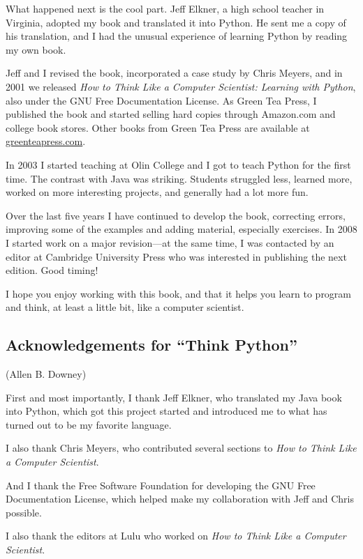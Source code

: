 \documentclass[11pt]{book}
\begin{document}
What happened next is the cool part.  Jeff Elkner, a high school
teacher in Virginia, adopted my book and translated it into
Python.  He sent me a copy of his translation, and I had the
unusual experience of learning Python by reading my own book.

Jeff and I revised the book, incorporated a case study by
Chris Meyers, and in 2001 we released \emph{How to Think Like
a Computer Scientist: Learning with Python}, also under
the GNU Free Documentation License.
As Green Tea Press, I published the book and started selling
hard copies through Amazon.com and college book stores.
Other books from Green Tea Press are available at
\url{greenteapress.com}.

In 2003 I started teaching at Olin College and I got to teach
Python for the first time.  The contrast with Java was striking.
Students struggled less, learned more, worked on more interesting
projects, and generally had a lot more fun.

Over the last five years I have continued to develop the book,
correcting errors, improving some of the examples and
adding material, especially exercises.  In 2008 I started work
on a major revision---at the same time, I was
contacted by an editor at Cambridge University Press who
was interested in publishing the next edition.  Good timing!

I hope you enjoy working with this book, and that it helps
you learn to program and think, at least a little bit, like
a computer scientist.

\subsection*{Acknowledgements for ``Think Python''}

(Allen B. Downey)

First and most importantly, I thank Jeff Elkner, who
translated my Java book into Python, which got this project
started and introduced me to what has turned out to be my
favorite language.

I also thank Chris Meyers, who contributed several sections
to \emph{How to Think Like a Computer Scientist}.

And I thank the Free Software Foundation for developing
the GNU Free Documentation License, which helped make
my collaboration with Jeff and Chris possible.


I also thank the editors at Lulu who worked on
\emph{How to Think Like a Computer Scientist}.
\end{document}
